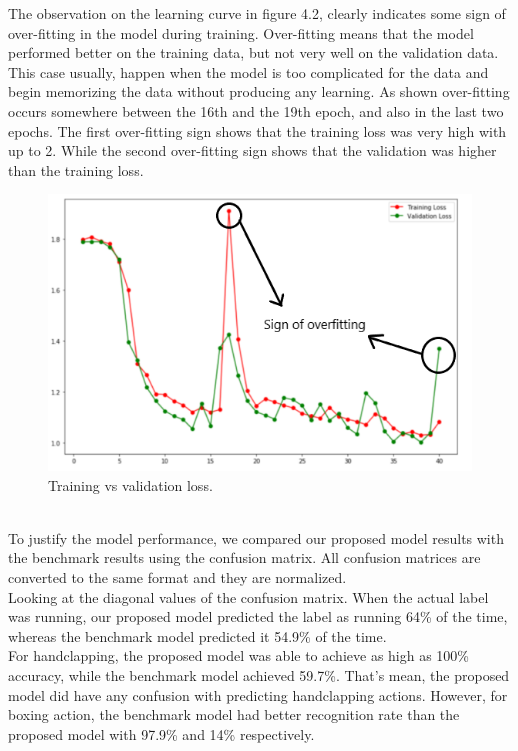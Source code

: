 The observation on the learning curve in figure 4.2, clearly indicates some sign of over-fitting in the model during training. Over-fitting means that the model performed better on the training data, but not very well on the validation data. This case usually, happen when the model is too complicated for the data and begin memorizing the data without producing any learning. As shown over-fitting occurs somewhere between the 16th and the 19th epoch, and also in the last two epochs. The first over-fitting sign shows that the training loss was very high with up to 2. While the second over-fitting sign shows that the validation was higher than the training loss.
\newpage
\begin{figure}[ht]
    \centering
    \includegraphics{Figures/ml}
    \decoRule
    \caption [Training vs validation loss.]{Training vs validation loss.}
    \label{fig:la}
    \end{figure}\hfill \\
    
    To justify the model performance, we compared our proposed model results with the benchmark results using the confusion matrix. All confusion matrices are converted to the same format and they are normalized.\\
    
    Looking at the diagonal values of the confusion matrix. When the actual label was running, our proposed model predicted the label as running 64\% of the time, whereas the benchmark model predicted it 54.9\% of the time.\\
    
    For handclapping, the proposed model was able to achieve as high as 100\% accuracy, while the benchmark model achieved 59.7\%. That's mean, the proposed model did have any confusion with predicting handclapping actions. However, for boxing action, the benchmark model had better recognition rate than the proposed model with 97.9\% and 14\% respectively.\\
    
